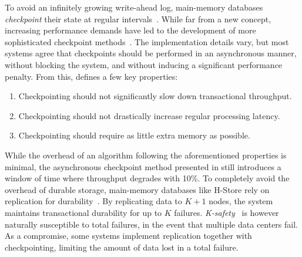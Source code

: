 To avoid an infinitely growing write-ahead log, main-memory databases
\textit{checkpoint} their state at regular intervals~\cite{main-memory, dali,
margaret, voltdb-recovery, hekaton}. While far from a new concept, increasing
performance demands have led to the development of more sophisticated checkpoint
methods~\cite{memory-checkpoint, siren}. The implementation details vary, but
most systems agree that checkpoints should be performed in an asynchronous
manner, without blocking the system, and without inducing a significant
performance penalty. From this, \cite{memory-checkpoint} defines a few key
properties:

\begin{enumerate}
  \item Checkpointing should not significantly slow down transactional throughput.
  \item Checkpointing should not drastically increase regular processing latency.
  \item Checkpointing should require as little extra memory as possible.
\end{enumerate}

While the overhead of an algorithm following the aforementioned properties is
minimal, the asynchronous checkpoint method presented in
\cite{memory-checkpoint} still introduces a window of time where throughput
degrades with 10\%. To completely avoid the overhead of durable storage,
main-memory databases like H-Store rely on replication for
durability~\cite{hstore}. By replicating data to $ K + 1 $ nodes, the system
maintains transactional durability for up to $ K $ failures.
\textit{K-safety}~\cite{cstore} is however naturally susceptible to total
failures, \eg in the event that multiple data centers fail. As a compromise,
some systems implement replication together with checkpointing, limiting the
amount of data lost in a total failure.
